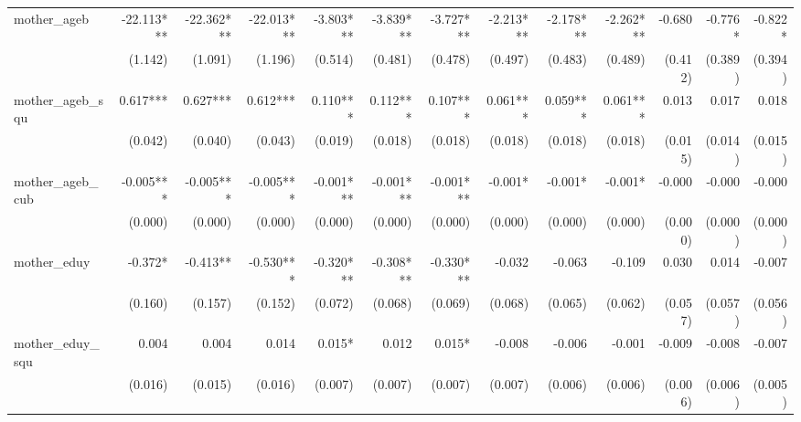 \begin{tabular}{lrrrrrrrrrrrr}
mother\_ageb                                &   -22.113*** &   -22.362*** &   -22.013*** &    -3.803*** &    -3.839*** &    -3.727*** &    -2.213*** &    -2.178*** &    -2.262*** &       -0.680 &      -0.776* &      -0.822* \\ 
                                            &      (1.142) &      (1.091) &      (1.196) &      (0.514) &      (0.481) &      (0.478) &      (0.497) &      (0.483) &      (0.489) &      (0.412) &      (0.389) &      (0.394) \\ 
mother\_ageb\_squ                           &     0.617*** &     0.627*** &     0.612*** &     0.110*** &     0.112*** &     0.107*** &     0.061*** &     0.059*** &     0.061*** &        0.013 &        0.017 &        0.018 \\ 
                                            &      (0.042) &      (0.040) &      (0.043) &      (0.019) &      (0.018) &      (0.018) &      (0.018) &      (0.018) &      (0.018) &      (0.015) &      (0.014) &      (0.015) \\ 
mother\_ageb\_cub                           &    -0.005*** &    -0.005*** &    -0.005*** &    -0.001*** &    -0.001*** &    -0.001*** &      -0.001* &      -0.001* &      -0.001* &       -0.000 &       -0.000 &       -0.000 \\ 
                                            &      (0.000) &      (0.000) &      (0.000) &      (0.000) &      (0.000) &      (0.000) &      (0.000) &      (0.000) &      (0.000) &      (0.000) &      (0.000) &      (0.000) \\ 
mother\_eduy                                &      -0.372* &     -0.413** &    -0.530*** &    -0.320*** &    -0.308*** &    -0.330*** &       -0.032 &       -0.063 &       -0.109 &        0.030 &        0.014 &       -0.007 \\ 
                                            &      (0.160) &      (0.157) &      (0.152) &      (0.072) &      (0.068) &      (0.069) &      (0.068) &      (0.065) &      (0.062) &      (0.057) &      (0.057) &      (0.056) \\ 
mother\_eduy\_squ                           &        0.004 &        0.004 &        0.014 &       0.015* &        0.012 &       0.015* &       -0.008 &       -0.006 &       -0.001 &       -0.009 &       -0.008 &       -0.007 \\ 
                                            &      (0.016) &      (0.015) &      (0.016) &      (0.007) &      (0.007) &      (0.007) &      (0.007) &      (0.006) &      (0.006) &      (0.006) &      (0.006) &      (0.005) \\ 

\end{tabular}
